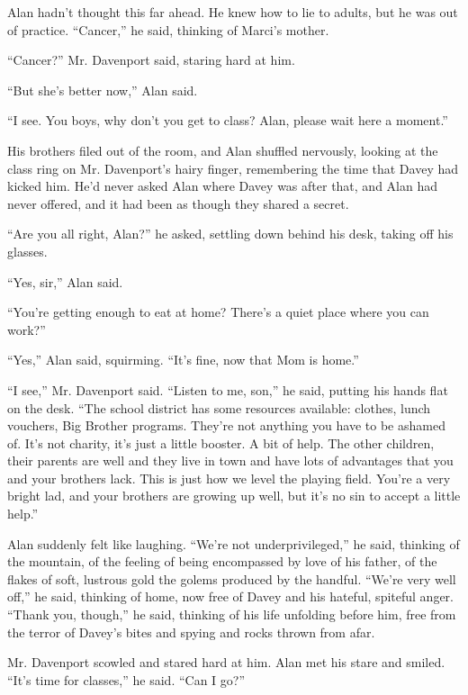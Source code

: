 Alan hadn't thought this far ahead.  He knew how to lie to adults, but
he was out of practice.  ``Cancer,'' he said, thinking of Marci's
mother.

``Cancer?'' Mr.  Davenport said, staring hard at him.

``But she's better now,'' Alan said.

``I see.  You boys, why don't you get to class?  Alan, please wait
here a moment.''

His brothers filed out of the room,  and Alan shuffled nervously,
looking at the class ring on Mr.  Davenport's hairy finger,
remembering the time that Davey had kicked him.  He'd never asked Alan
where Davey was after that, and Alan had never offered, and it had
been as though they shared a secret.

``Are you all right, Alan?'' he asked, settling down behind his desk,
taking off his glasses.

``Yes, sir,'' Alan said.

``You're getting enough to eat at home?  There's a quiet place where
you can work?''

``Yes,'' Alan said, squirming.  ``It's fine, now that Mom is home.''

``I see,'' Mr.  Davenport said.  ``Listen to me, son,'' he said,
putting his hands flat on the desk.  ``The school district has some
resources available:  clothes, lunch vouchers, Big Brother programs. 
They're not anything you have to be ashamed of.  It's not charity,
it's just a little booster.  A bit of help.  The other children, their
parents are well and they live in town and have lots of advantages
that you and your brothers lack.  This is just how we level the
playing field.  You're a very bright lad, and your brothers are
growing up well, but it's no sin to accept a little help.''

Alan suddenly felt like laughing.  ``We're not underprivileged,'' he
said, thinking of the mountain, of the feeling of being encompassed by
love of his father, of the flakes of soft, lustrous gold the golems
produced by the handful.  ``We're very well off,'' he said, thinking
of home, now free of Davey and his hateful, spiteful anger.  ``Thank
you, though,'' he said, thinking of his life unfolding before him,
free from the terror of Davey's bites and spying and rocks thrown from
afar.

Mr.  Davenport scowled and stared hard at him.  Alan met his stare and
smiled.  ``It's time for classes,'' he said.  ``Can I go?''


